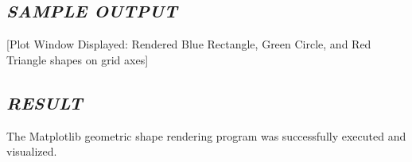 \documentclass[11pt,a4paper]{article}
\begin{document}
\subsection*{\textit{SAMPLE OUTPUT}}
\begin{tcolorbox}[colback=black!85,colframe=navyblue,title=\textbf{Terminal Output},coltitle=white,fonttitle=\bfseries\small]
\small\ttfamily\color{green!30!white}
[Plot Window Displayed: Rendered Blue Rectangle, Green Circle, and Red Triangle shapes on grid axes]
\end{tcolorbox}

\subsection*{\textit{RESULT}}
The Matplotlib geometric shape rendering program was successfully executed and visualized.

\newpage
\end{document}
